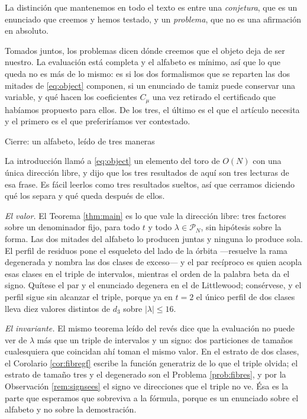 \documentclass[11pt,reqno]{amsart}
\makeatletter
\renewcommand\section{\@startsection{section}{1}%
  \z@{\linespacing\@plus\linespacing}{.5\linespacing}%
  {\normalfont\large\bfseries\centering}}
\theoremstyle{plain}
\theoremstyle{definition}
\newcommand{\PP}{\mathcal{P}}
\makeatother
\begin{document}
La distinción que mantenemos en todo el texto es entre una \emph{conjetura}, que es un enunciado que
creemos y hemos testado, y un \emph{problema}, que no es una afirmación en absoluto.

Tomados juntos, los problemas dicen dónde creemos que el objeto deja de ser nuestro. La evaluación
está completa y el alfabeto es mínimo, así que lo que queda no es más de lo mismo: es si los dos
formalismos que se reparten las dos mitades de \eqref{eq:object} componen, si un enunciado de tamiz
puede conservar una variable, y qué hacen los coeficientes $C_\mu$ una vez retirado el certificado
que habíamos propuesto para ellos. De los tres, el último es el que el artículo necesita y el primero
es el que preferiríamos ver contestado.

\section{Cierre: un alfabeto, leído de tres maneras}\label{sec:closing}

La introducción llamó a \eqref{eq:object} un elemento del toro de $O(N)$ con una única dirección
libre, y dijo que los tres resultados de aquí son tres lecturas de esa frase. Es fácil leerlos como
tres resultados sueltos, así que cerramos diciendo qué los separa y qué queda después de ellos.

\emph{El valor.} El Teorema \ref{thm:main} es lo que vale la dirección libre: tres factores sobre un
denominador fijo, para todo $t$ y todo $\lambda\in\PP_N$, sin hipótesis sobre la forma. Las dos
mitades del alfabeto lo producen juntas y ninguna lo produce sola. El perfil de residuos pone el
esqueleto del lado de la órbita ---resuelve la rama degenerada y nombra las dos clases de exceso---
y el par recíproco es quien acopla esas clases en el triple de intervalos, mientras el orden de la
palabra beta da el signo. Quítese el par y el enunciado degenera en el de Littlewood; consérvese, y
el perfil sigue sin alcanzar el triple, porque ya en $t=2$ el único perfil de dos clases lleva diez
valores distintos de $d_3$ sobre $|\lambda|\le16$.

\emph{El invariante.} El mismo teorema leído del revés dice que la evaluación no puede ver de
$\lambda$ más que un triple de intervalos y un signo: dos particiones de tamaños cualesquiera que
coincidan ahí toman el mismo valor. En el estrato de dos clases, el Corolario \ref{cor:fibregf}
escribe la función generatriz de lo que el triple olvida; el estrato de tamaño tres y el degenerado
son el Problema \ref{prob:fibres}, y por la Observación \ref{rem:signsees} el signo ve direcciones
que el triple no ve. Ésa es la parte que esperamos que sobreviva a la fórmula, porque es un
enunciado sobre el alfabeto y no sobre la demostración.
\end{document}
